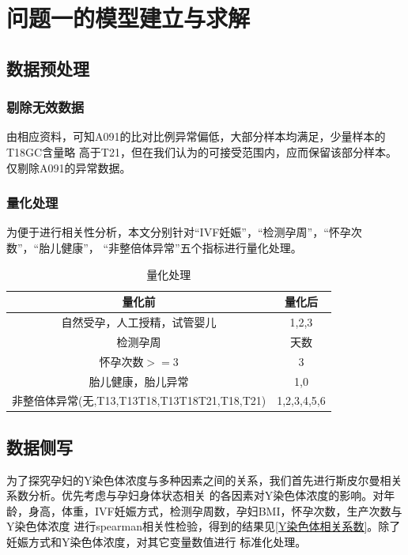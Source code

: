 \documentclass[withoutpreface,notoc]{cumcmthesis}
\begin{document}
	
	\section{问题一的模型建立与求解}

	\subsection{数据预处理}

	\subsubsection{剔除无效数据}
	由相应资料，可知A091的比对比例异常偏低，大部分样本均满足，少量样本的T18GC含量略
	高于T21，但在我们认为的可接受范围内，应而保留该部分样本。仅剔除A091的异常数据。

	\subsubsection{量化处理}
	为便于进行相关性分析，本文分别针对“IVF妊娠”，“检测孕周”，“怀孕次数”，“胎儿健康”，
	“非整倍体异常”五个指标进行量化处理。


	\begin{table}[H]
		\centering
		\caption{量化处理}
		\label{量化处理}
		\begin{tabularx}{\textwidth}{cc}
			\toprule
			\textbf{量化前} & \textbf{量化后} \\
			\midrule
			自然受孕，人工授精，试管婴儿     & 1,2,3 \\
			检测孕周      & 天数 \\
			怀孕次数$>=3$      & 3 \\
			胎儿健康，胎儿异常     & 1,0 \\
			非整倍体异常(无,T13,T13T18,T13T18T21,T18,T21) & 1,2,3,4,5,6 \\
			\bottomrule
		\end{tabularx}
	\end{table}


	\subsection{数据侧写}

	为了探究孕妇的Y染色体浓度与多种因素之间的关系，我们首先进行斯皮尔曼相关系数分析。优先考虑与孕妇身体状态相关
	的各因素对Y染色体浓度的影响。对年龄，身高，体重，IVF妊娠方式，检测孕周数，孕妇BMI，怀孕次数，生产次数与Y染色体浓度
	进行spearman相关性检验，得到的结果见\cref{Y染色体相关系数}。除了妊娠方式和Y染色体浓度，对其它变量数值进行
	标准化处理。
\end{document}
